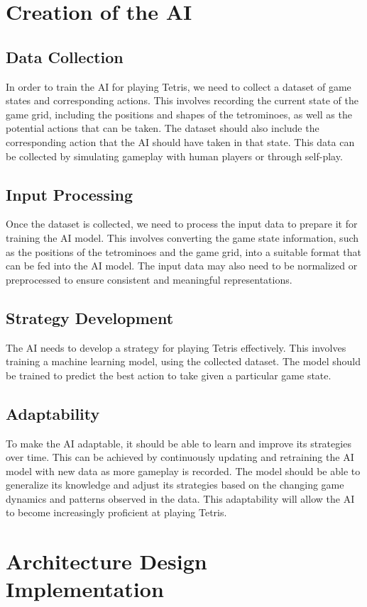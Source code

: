 \documentclass[conference]{IEEEtran}
\begin{document}
\section*{Creation of the AI}

\subsection{Data Collection}
In order to train the AI for playing Tetris, we need to collect a dataset of game states and corresponding actions. This involves recording the current state of the game grid, including the positions and shapes of the tetrominoes, as well as the potential actions that can be taken. The dataset should also include the corresponding action that the AI should have taken in that state. This data can be collected by simulating gameplay with human players or through self-play.
\subsection{Input Processing}
Once the dataset is collected, we need to process the input data to prepare it for training the AI model. This involves converting the game state information, such as the positions of the tetrominoes and the game grid, into a suitable format that can be fed into the AI model. The input data may also need to be normalized or preprocessed to ensure consistent and meaningful representations.
\subsection{Strategy Development}
The AI needs to develop a strategy for playing Tetris effectively. This involves training a machine learning model, using the collected dataset. The model should be trained to predict the best action to take given a particular game state.
\subsection{Adaptability}
To make the AI adaptable, it should be able to learn and improve its strategies over time. This can be achieved by continuously updating and retraining the AI model with new data as more gameplay is recorded. The model should be able to generalize its knowledge and adjust its strategies based on the changing game dynamics and patterns observed in the data. This adaptability will allow the AI to become increasingly proficient at playing Tetris.

\clearpage
\section{Architecture Design Implementation}
\end{document}

